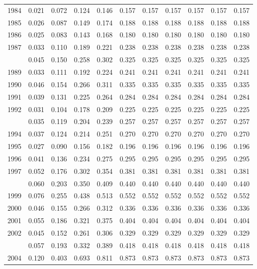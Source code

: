\documentclass[
]{article}
\begin{document}
\begin{longtable}[t]{lrrrrrrrrrr}
1984 & 0.021 & 0.072 & 0.124 & 0.146 & 0.157 & 0.157 & 0.157 & 0.157 & 0.157 & 0.157\\
1985 & 0.026 & 0.087 & 0.149 & 0.174 & 0.188 & 0.188 & 0.188 & 0.188 & 0.188 & 0.188\\
1986 & 0.025 & 0.083 & 0.143 & 0.168 & 0.180 & 0.180 & 0.180 & 0.180 & 0.180 & 0.180\\
1987 & 0.033 & 0.110 & 0.189 & 0.221 & 0.238 & 0.238 & 0.238 & 0.238 & 0.238 & 0.238\\
\addlinespace
1988 & 0.045 & 0.150 & 0.258 & 0.302 & 0.325 & 0.325 & 0.325 & 0.325 & 0.325 & 0.325\\
1989 & 0.033 & 0.111 & 0.192 & 0.224 & 0.241 & 0.241 & 0.241 & 0.241 & 0.241 & 0.241\\
1990 & 0.046 & 0.154 & 0.266 & 0.311 & 0.335 & 0.335 & 0.335 & 0.335 & 0.335 & 0.335\\
1991 & 0.039 & 0.131 & 0.225 & 0.264 & 0.284 & 0.284 & 0.284 & 0.284 & 0.284 & 0.284\\
1992 & 0.031 & 0.104 & 0.178 & 0.209 & 0.225 & 0.225 & 0.225 & 0.225 & 0.225 & 0.225\\
\addlinespace
1993 & 0.035 & 0.119 & 0.204 & 0.239 & 0.257 & 0.257 & 0.257 & 0.257 & 0.257 & 0.257\\
1994 & 0.037 & 0.124 & 0.214 & 0.251 & 0.270 & 0.270 & 0.270 & 0.270 & 0.270 & 0.270\\
1995 & 0.027 & 0.090 & 0.156 & 0.182 & 0.196 & 0.196 & 0.196 & 0.196 & 0.196 & 0.196\\
1996 & 0.041 & 0.136 & 0.234 & 0.275 & 0.295 & 0.295 & 0.295 & 0.295 & 0.295 & 0.295\\
1997 & 0.052 & 0.176 & 0.302 & 0.354 & 0.381 & 0.381 & 0.381 & 0.381 & 0.381 & 0.381\\
\addlinespace
1998 & 0.060 & 0.203 & 0.350 & 0.409 & 0.440 & 0.440 & 0.440 & 0.440 & 0.440 & 0.440\\
1999 & 0.076 & 0.255 & 0.438 & 0.513 & 0.552 & 0.552 & 0.552 & 0.552 & 0.552 & 0.552\\
2000 & 0.046 & 0.155 & 0.266 & 0.312 & 0.336 & 0.336 & 0.336 & 0.336 & 0.336 & 0.336\\
2001 & 0.055 & 0.186 & 0.321 & 0.375 & 0.404 & 0.404 & 0.404 & 0.404 & 0.404 & 0.404\\
2002 & 0.045 & 0.152 & 0.261 & 0.306 & 0.329 & 0.329 & 0.329 & 0.329 & 0.329 & 0.329\\
\addlinespace
2003 & 0.057 & 0.193 & 0.332 & 0.389 & 0.418 & 0.418 & 0.418 & 0.418 & 0.418 & 0.418\\
2004 & 0.120 & 0.403 & 0.693 & 0.811 & 0.873 & 0.873 & 0.873 & 0.873 & 0.873 & 0.873\\

\end{longtable}
\end{document}
